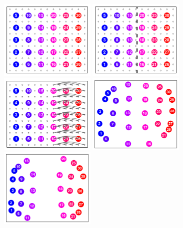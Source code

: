 \documentclass[10pt,letterpaper]{article}
\begin{document}
\begin{figure}
	\centering
			{\includegraphics[width=1.8in,height=1.5in]{../figs/sims/basic_lattice.pdf}}
			{\includegraphics[width=1.8in,height=1.5in]{../figs/sims/barrier_lattice.pdf}}
			{\includegraphics[width=1.8in,height=1.5in]{../figs/sims/expansion_lattice.pdf}}
			{\includegraphics[width=1.8in,height=1.5in]{../figs/sims/GeoGenMap_lattice.pdf}}
			{\includegraphics[width=1.8in,height=1.5in]{../figs/sims/GeoGenMap_barrier.pdf}}

\end{figure}
\end{document}
